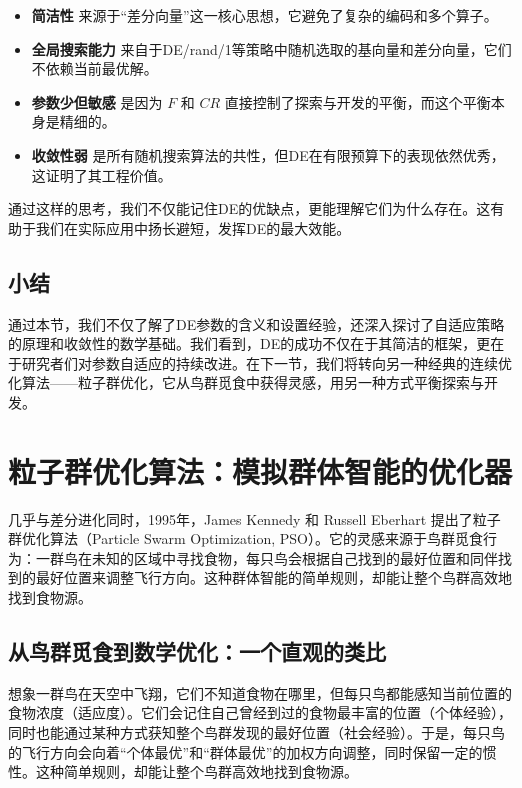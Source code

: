 \documentclass[lang=cn,zihao=-4,a4paper,fontset=windows]{beautybook}
\begin{document}
\begin{itemize}
    \item \textbf{简洁性} 来源于“差分向量”这一核心思想，它避免了复杂的编码和多个算子。
    \item \textbf{全局搜索能力} 来自于DE/rand/1等策略中随机选取的基向量和差分向量，它们不依赖当前最优解。
    \item \textbf{参数少但敏感} 是因为 $F$ 和 $CR$ 直接控制了探索与开发的平衡，而这个平衡本身是精细的。
    \item \textbf{收敛性弱} 是所有随机搜索算法的共性，但DE在有限预算下的表现依然优秀，这证明了其工程价值。
\end{itemize}

通过这样的思考，我们不仅能记住DE的优缺点，更能理解它们为什么存在。这有助于我们在实际应用中扬长避短，发挥DE的最大效能。

\subsection{小结}

通过本节，我们不仅了解了DE参数的含义和设置经验，还深入探讨了自适应策略的原理和收敛性的数学基础。我们看到，DE的成功不仅在于其简洁的框架，更在于研究者们对参数自适应的持续改进。在下一节，我们将转向另一种经典的连续优化算法——粒子群优化，它从鸟群觅食中获得灵感，用另一种方式平衡探索与开发。

\section{粒子群优化算法：模拟群体智能的优化器}

几乎与差分进化同时，1995年，James Kennedy 和 Russell Eberhart 提出了粒子群优化算法（Particle Swarm Optimization, PSO）。它的灵感来源于鸟群觅食行为：一群鸟在未知的区域中寻找食物，每只鸟会根据自己找到的最好位置和同伴找到的最好位置来调整飞行方向。这种群体智能的简单规则，却能让整个鸟群高效地找到食物源。

\subsection{从鸟群觅食到数学优化：一个直观的类比}

想象一群鸟在天空中飞翔，它们不知道食物在哪里，但每只鸟都能感知当前位置的食物浓度（适应度）。它们会记住自己曾经到过的食物最丰富的位置（个体经验），同时也能通过某种方式获知整个鸟群发现的最好位置（社会经验）。于是，每只鸟的飞行方向会向着“个体最优”和“群体最优”的加权方向调整，同时保留一定的惯性。这种简单规则，却能让整个鸟群高效地找到食物源。
\end{document}
